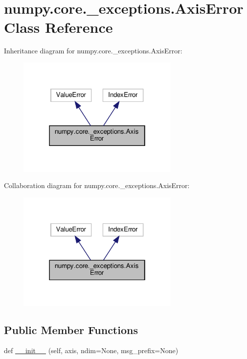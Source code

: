 \hypertarget{classnumpy_1_1core_1_1__exceptions_1_1AxisError}{}\section{numpy.\+core.\+\_\+exceptions.\+Axis\+Error Class Reference}
\label{classnumpy_1_1core_1_1__exceptions_1_1AxisError}


Inheritance diagram for numpy.\+core.\+\_\+exceptions.\+Axis\+Error\+:
\nopagebreak
\begin{figure}[H]
\begin{center}
\leavevmode
\includegraphics[width=226pt]{classnumpy_1_1core_1_1__exceptions_1_1AxisError__inherit__graph}
\end{center}
\end{figure}


Collaboration diagram for numpy.\+core.\+\_\+exceptions.\+Axis\+Error\+:
\nopagebreak
\begin{figure}[H]
\begin{center}
\leavevmode
\includegraphics[width=226pt]{classnumpy_1_1core_1_1__exceptions_1_1AxisError__coll__graph}
\end{center}
\end{figure}
\subsection*{Public Member Functions}
\begin{DoxyCompactItemize}
\item 
def \hyperlink{classnumpy_1_1core_1_1__exceptions_1_1AxisError_a463663b3f25704e21f3418c6db30952e}{\+\_\+\+\_\+init\+\_\+\+\_\+} (self, axis, ndim=None, msg\+\_\+prefix=None)
\end{DoxyCompactItemize}


